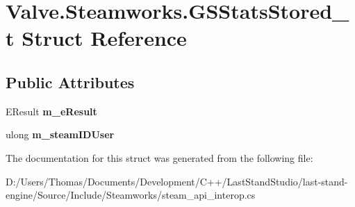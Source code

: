 \hypertarget{structValve_1_1Steamworks_1_1GSStatsStored__t}{}\section{Valve.\+Steamworks.\+G\+S\+Stats\+Stored\+\_\+t Struct Reference}
\label{structValve_1_1Steamworks_1_1GSStatsStored__t}
\subsection*{Public Attributes}
\begin{DoxyCompactItemize}
\item 
\hypertarget{structValve_1_1Steamworks_1_1GSStatsStored__t_af09fa5c499c76d9e15fe44428dd4cf22}{}E\+Result {\bfseries m\+\_\+e\+Result}\label{structValve_1_1Steamworks_1_1GSStatsStored__t_af09fa5c499c76d9e15fe44428dd4cf22}

\item 
\hypertarget{structValve_1_1Steamworks_1_1GSStatsStored__t_ad581819292d8f0eb04996f680f4e4b81}{}ulong {\bfseries m\+\_\+steam\+I\+D\+User}\label{structValve_1_1Steamworks_1_1GSStatsStored__t_ad581819292d8f0eb04996f680f4e4b81}

\end{DoxyCompactItemize}


The documentation for this struct was generated from the following file\+:\begin{DoxyCompactItemize}
\item 
D\+:/\+Users/\+Thomas/\+Documents/\+Development/\+C++/\+Last\+Stand\+Studio/last-\/stand-\/engine/\+Source/\+Include/\+Steamworks/steam\+\_\+api\+\_\+interop.\+cs\end{DoxyCompactItemize}
